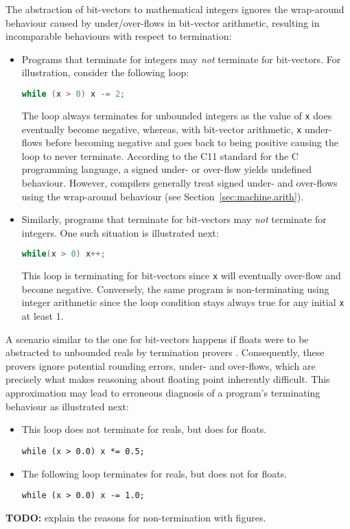 \documentclass[preprint]{sigplanconf}
\theoremstyle{definition}
\newcommand{\todo}[1]{{\bf TODO:} #1}
\begin{document}
 The abstraction of bit-vectors to mathematical integers 
ignores the wrap-around behaviour caused by under/over-flows in bit-vector arithmetic, resulting in %
incomparable behaviours with respect to termination:
\begin{itemize}
\item Programs that terminate for integers may \emph{not} terminate for bit-vectors. For illustration, consider the following loop:
\begin{lstlisting}[language=C]
while (x > 0) x -= 2;
\end{lstlisting}
The loop always terminates for unbounded integers as the value of \texttt{x} does eventually become negative, 
whereas, with bit-vector arithmetic, \texttt{x} under-flows before becoming negative and goes back to being positive causing the loop to never terminate.
According to the C11 standard for the C programming language, a signed under- or over-flow yields undefined behaviour.
However, compilers generally treat signed under- and over-flows using the
wrap-around behaviour (see Section~\ref{sec:machine.arith}). 
\item Similarly, programs that terminate for bit-vectors may \emph{not} terminate for integers. One such situation is illustrated next:  
 \begin{lstlisting}[language=C]
 while(x > 0) x++;
 \end{lstlisting}
This loop is  terminating for bit-vectors since \texttt{x}
will eventually over-flow and become negative. Conversely, the same program is non-terminating using integer
arithmetic since the loop condition stays always true for any initial \texttt{x} at least 1.
\end{itemize}

 A scenario similar to the one for bit-vectors happens if floats were to be abstracted to unbounded reals by termination provers \cite{}. 
Consequently, these provers ignore potential rounding errors, under- and over-flows, which are precisely what makes  reasoning about floating point inherently difficult.
This approximation may lead to erroneous diagnosis of a program's terminating behaviour as illustrated next:
\begin{itemize}
\item This loop does not terminate for reals, but does for floats.
\begin{lstlisting}
while (x > 0.0) x *= 0.5;
\end{lstlisting}

\item The following loop terminates for reals, but does not for floats.
\begin{lstlisting}
while (x > 0.0) x -= 1.0;
\end{lstlisting}
\end{itemize}   
\todo{explain the reasons for non-termination with figures.}\\
\end{document}

